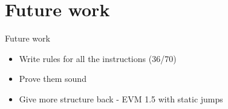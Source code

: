 \documentclass{beamer}
\begin{document}
\part{Future work}
\frame{\partpage}

\begin{frame}{Future work}
	\begin{itemize}
		\item Write rules for all the instructions (36/70)
		\item Prove them sound
		\item Give more structure back - EVM 1.5 with static jumps
	\end{itemize}
\end{frame}


\frame[plain]{\thankspage{}{}{}{}{}}



\end{document}
